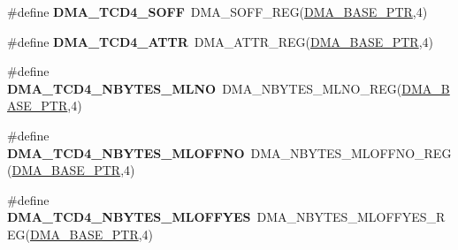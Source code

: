 \begin{DoxyCompactItemize}
\item 
\hypertarget{group___d_m_a___register___accessor___macros_gac5daecfc1646478ddba0208c44bd95de}{}\#define {\bfseries D\+M\+A\+\_\+\+T\+C\+D4\+\_\+\+S\+O\+F\+F}~D\+M\+A\+\_\+\+S\+O\+F\+F\+\_\+\+R\+E\+G(\hyperlink{group___d_m_a___peripheral_ga6997fbc1b1973e9f27170217a3bd6f22}{D\+M\+A\+\_\+\+B\+A\+S\+E\+\_\+\+P\+T\+R},4)\label{group___d_m_a___register___accessor___macros_gac5daecfc1646478ddba0208c44bd95de}

\item 
\hypertarget{group___d_m_a___register___accessor___macros_gafd8951a9fcbce81a5a61e455663f75b6}{}\#define {\bfseries D\+M\+A\+\_\+\+T\+C\+D4\+\_\+\+A\+T\+T\+R}~D\+M\+A\+\_\+\+A\+T\+T\+R\+\_\+\+R\+E\+G(\hyperlink{group___d_m_a___peripheral_ga6997fbc1b1973e9f27170217a3bd6f22}{D\+M\+A\+\_\+\+B\+A\+S\+E\+\_\+\+P\+T\+R},4)\label{group___d_m_a___register___accessor___macros_gafd8951a9fcbce81a5a61e455663f75b6}

\item 
\hypertarget{group___d_m_a___register___accessor___macros_ga15f1f1198c82e029336d290baffd758a}{}\#define {\bfseries D\+M\+A\+\_\+\+T\+C\+D4\+\_\+\+N\+B\+Y\+T\+E\+S\+\_\+\+M\+L\+N\+O}~D\+M\+A\+\_\+\+N\+B\+Y\+T\+E\+S\+\_\+\+M\+L\+N\+O\+\_\+\+R\+E\+G(\hyperlink{group___d_m_a___peripheral_ga6997fbc1b1973e9f27170217a3bd6f22}{D\+M\+A\+\_\+\+B\+A\+S\+E\+\_\+\+P\+T\+R},4)\label{group___d_m_a___register___accessor___macros_ga15f1f1198c82e029336d290baffd758a}

\item 
\hypertarget{group___d_m_a___register___accessor___macros_ga6366797b418a1074278f15243b4ef66c}{}\#define {\bfseries D\+M\+A\+\_\+\+T\+C\+D4\+\_\+\+N\+B\+Y\+T\+E\+S\+\_\+\+M\+L\+O\+F\+F\+N\+O}~D\+M\+A\+\_\+\+N\+B\+Y\+T\+E\+S\+\_\+\+M\+L\+O\+F\+F\+N\+O\+\_\+\+R\+E\+G(\hyperlink{group___d_m_a___peripheral_ga6997fbc1b1973e9f27170217a3bd6f22}{D\+M\+A\+\_\+\+B\+A\+S\+E\+\_\+\+P\+T\+R},4)\label{group___d_m_a___register___accessor___macros_ga6366797b418a1074278f15243b4ef66c}

\item 
\hypertarget{group___d_m_a___register___accessor___macros_gaf819508a4a70a0d564efc5f86e92ce3e}{}\#define {\bfseries D\+M\+A\+\_\+\+T\+C\+D4\+\_\+\+N\+B\+Y\+T\+E\+S\+\_\+\+M\+L\+O\+F\+F\+Y\+E\+S}~D\+M\+A\+\_\+\+N\+B\+Y\+T\+E\+S\+\_\+\+M\+L\+O\+F\+F\+Y\+E\+S\+\_\+\+R\+E\+G(\hyperlink{group___d_m_a___peripheral_ga6997fbc1b1973e9f27170217a3bd6f22}{D\+M\+A\+\_\+\+B\+A\+S\+E\+\_\+\+P\+T\+R},4)\label{group___d_m_a___register___accessor___macros_gaf819508a4a70a0d564efc5f86e92ce3e}


\end{DoxyCompactItemize}
